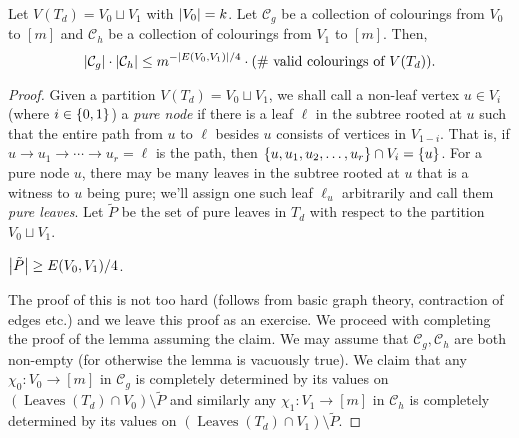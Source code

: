 \begin{lemma}\label{lem:MonSep-partial-colourings-consistence}
  Let $V(T_d) = V_0 \sqcup V_1$ with $\left|V_0\right| = k$. Let $\mathcal{C}_g$ be a collection of colourings from $V_0$ to $[m]$ and $\mathcal{C}_h$ be a collection of colourings from $V_1$ to $[m]$. Then,
  \[
    \left|\mathcal{C}_g\right| \cdot \left|\mathcal{C}_h\right| \leq m^{-\left|E(V_0,V_1)\right|/4} \cdot (\#\text{ valid colourings of $V(T_d)$}). 
  \]
\end{lemma}
\begin{proof}
  Given a partition $V(T_d) = V_0 \sqcup V_1$, we shall call a non-leaf vertex $u \in V_i$ (where $i \in \left\{0,1\right\}$) a \emph{pure node} if there is a leaf $\ell$ in the subtree rooted at $u$ such that the entire path from $u$ to $\ell$ besides $u$ consists of vertices in $V_{1-i}$.
That is, if $u\rightarrow u_1 \rightarrow \cdots \rightarrow u_r = \ell$ is the path, then $\left\{u,u_1,u_2,\ldots, u_r\right\} \cap V_i = \left\{u\right\}$.
For a pure node $u$, there may be many leaves in the subtree rooted at $u$ that is a witness to $u$ being pure; we'll assign one such leaf $\ell_u$ arbitrarily and call them \emph{pure leaves}.
Let $\tilde{P}$ be the set of pure leaves in $T_d$ with respect to the partition $V_0\sqcup V_1$.
\begin{addmargin}[2em]{2em}
  \begin{subclaim}\label{subclaim:monSep-many-pure-nodes}
    $\left|\tilde{P}\right| \geq E(V_0,V_1)/4$. 
  \end{subclaim}

  \bigskip
  
\end{addmargin}

The proof of this is not too hard (follows from basic graph theory, contraction of edges etc.) and we leave this proof as an exercise. We proceed with completing the proof of the lemma assuming the claim. We may assume that $\mathcal{C}_g,\mathcal{C}_h$ are both non-empty (for otherwise the lemma is vacuously true). We claim that any $\chi_0:V_0 \rightarrow [m]$ in $\mathcal{C}_g$ is completely determined by its values on $(\operatorname{Leaves}(T_d) \cap V_0) \setminus \tilde{P}$ and similarly any $\chi_1:V_1\rightarrow [m]$ in $\mathcal{C}_h$ is completely determined by its values on $(\operatorname{Leaves}(T_d) \cap V_1) \setminus \tilde{P}$.


\end{proof}
